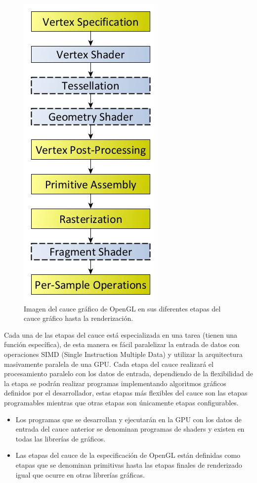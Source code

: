 \documentclass[a4paper, 17pt]{book}
\begin{document}
\begin{figure}[hbt!]
    \centering
    \includegraphics[scale=0.40, keepaspectratio]{img/RenderingPipeline.png}
    \caption{Imagen del cauce gráfico de OpenGL en sus diferentes etapas del cauce gráfico hasta la renderización.}
    \label{figura:khronos}
\end{figure}

Cada una de las etapas del cauce está especializada en una tarea (tienen una función específica), de esta manera es fácil
paralelizar la entrada de datos con operaciones SIMD (Single Instruction Multiple Data) y utilizar la arquitectura masivamente
paralela de una GPU. Cada etapa del cauce realizará el procesamiento paralelo con los datos de entrada, dependiendo de la
flexibilidad de la etapa se podrán realizar programas implementando algoritmos gráficos definidos por el desarrollador,
estas etapas más flexibles del cauce son las etapas programables mientras que otras etapas son únicamente etapas configurables.


\begin{itemize}
  \item Los programas que se desarrollan y ejecutarán en la GPU con los datos de entrada del cauce anterior se denominan programas
  de shaders y existen en todas las librerías de gráficos.
  
  \item Las etapas del cauce de la especificación de OpenGL están definidas como etapas que se denominan primitivas hasta las etapas
  finales de renderizado igual que ocurre en otras librerías gráficas.
\end{itemize}
\end{document}
